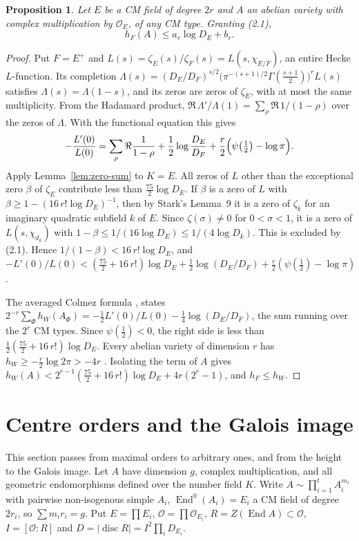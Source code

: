 \documentclass[11pt,a4paper]{article}
\theoremstyle{plain}
\newtheorem{proposition}[theorem]{Proposition}
\theoremstyle{remark}
\newcommand{\OO}{\mathcal O}
\newcommand{\End}{\operatorname{End}}
\newcommand{\disc}{\operatorname{disc}}
\begin{document}
\begin{proposition}\label{prop:height}
Let $E$ be a CM field of degree $2r$ and $A$ an abelian variety with complex multiplication by $\OO_E$, of any CM
type. Granting (2.1),
\[
 h_F(A)\leq a_r\log D_E+b_r.
\]
\end{proposition}

\begin{proof}
Put $F=E^+$ and $L(s)=\zeta_E(s)/\zeta_F(s)=L(s,\chi_{E/F})$, an entire Hecke $L$-function. Its completion
$\Lambda(s)=(D_E/D_F)^{s/2}\bigl(\pi^{-(s+1)/2}\Gamma(\tfrac{s+1}2)\bigr)^rL(s)$ satisfies $\Lambda(s)=\Lambda(1-s)$,
and its zeros are zeros of $\zeta_E$, with at most the same multiplicity. From the Hadamard product,
$\Re\,\Lambda'/\Lambda(1)=\sum_\rho\Re\,1/(1-\rho)$ over the zeros of $\Lambda$. With the functional equation this gives
\[
 -\frac{L'(0)}{L(0)}=\sum_\rho\Re\frac1{1-\rho}+\frac12\log\frac{D_E}{D_F}+\frac r2\Bigl(\psi\bigl(\tfrac12\bigr)-\log\pi\Bigr).
\]
Apply Lemma~\ref{lem:zero-sum} to $K=E$. All zeros of $L$ other than the exceptional zero $\beta$ of $\zeta_E$
contribute less than $\frac{75}2\log D_E$. If $\beta$ is a zero of $L$ with $\beta\geq1-(16\,r!\log D_E)^{-1}$, then by
Stark's Lemma~9 \cite[pp.~145--146]{Stark} it is a zero of $\zeta_k$ for an imaginary quadratic subfield $k$ of $E$. Since
$\zeta(\sigma)\neq0$ for $0<\sigma<1$, it is a zero of $L(s,\chi_{d_k})$ with $1-\beta\leq1/(16\log D_E)\leq1/(4\log D_k)$.
This is excluded by (2.1). Hence $1/(1-\beta)<16\,r!\log D_E$, and
$-L'(0)/L(0)<(\frac{75}2+16\,r!)\log D_E+\frac12\log(D_E/D_F)+\frac r2(\psi(\frac12)-\log\pi)$.

The averaged Colmez formula \cite[Theorem~1.1]{YZ}, \cite{AGHMP} states
$2^{-r}\sum_\Phi h_W(A_\Phi)=-\frac12L'(0)/L(0)-\frac14\log(D_E/D_F)$, the sum running over the $2^r$ CM types.
Since $\psi(\frac12)<0$, the right side is less than $\frac12(\frac{75}2+16\,r!)\log D_E$. Every abelian variety of
dimension $r$ has $h_W\geq-\frac r2\log2\pi>-4r$ \cite[Corollaire~8.4]{GR14}. Isolating the term of $A$ gives
$h_W(A)<2^{r-1}(\frac{75}2+16\,r!)\log D_E+4r(2^r-1)$, and $h_F\leq h_W$.
\end{proof}

\section{Centre orders and the Galois image}

This section passes from maximal orders to arbitrary ones, and from the height to the Galois image. Let $A$ have
dimension $g$, complex multiplication, and all geometric endomorphisms defined over the number field $K$. Write
$A\sim\prod_{i=1}^tA_i^{m_i}$ with pairwise non-isogenous simple $A_i$, $\End^0(A_i)=E_i$ a CM field of degree
$2r_i$, so $\sum m_ir_i=g$. Put $E=\prod E_i$, $\OO=\prod\OO_{E_i}$, $R=Z(\End A)\subset\OO$, $I=[\OO:R]$ and
$D=|\disc R|=I^2\prod_iD_{E_i}$.
\end{document}
